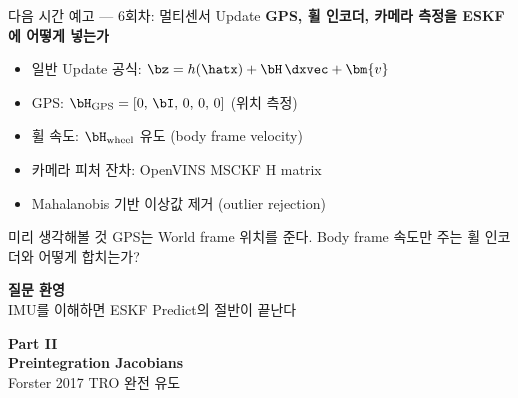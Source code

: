 \begin{frame}{다음 시간 예고 — 6회차: 멀티센서 Update}
  \textbf{GPS, 휠 인코더, 카메라 측정을 ESKF에 어떻게 넣는가}
  \begin{itemize}
    \item 일반 Update 공식: $\bz = h(\hatx) + \bH\,\dxvec + \bm{v}$
    \item GPS: $\bH_\text{GPS} = [0,\,\bI,\,0,\,0,\,0]$ (위치 측정)
    \item 휠 속도: $\bH_\text{wheel}$ 유도 (body frame velocity)
    \item 카메라 피처 잔차: OpenVINS MSCKF H matrix
    \item Mahalanobis 기반 이상값 제거 (outlier rejection)
  \end{itemize}
  \vspace{0.3em}
  \begin{block}{미리 생각해볼 것}
    GPS는 World frame 위치를 준다. Body frame 속도만 주는 휠 인코더와 어떻게 합치는가?
  \end{block}
\end{frame}

\begin{frame}
  \vspace{1.5cm}
  \begin{center}
    {\Huge \textbf{질문 환영}}\\[1em]
    \large IMU를 이해하면 ESKF Predict의 절반이 끝난다
  \end{center}
\end{frame}



\begin{frame}{}
  \begin{center}
    \vspace{2em}
    {\Large\bfseries Part II}\\[0.6em]
    {\LARGE\bfseries Preintegration Jacobians}\\[0.4em]
    {\large Forster 2017 TRO 완전 유도}\\[1.5em]
  \end{center}
\end{frame}

